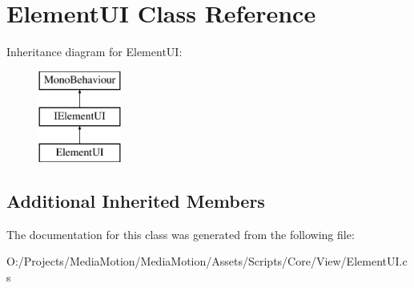 \hypertarget{class_element_u_i}{\section{Element\+U\+I Class Reference}
\label{class_element_u_i}
}
Inheritance diagram for Element\+U\+I\+:\begin{figure}[H]
\begin{center}
\leavevmode
\includegraphics[height=3.000000cm]{class_element_u_i}
\end{center}
\end{figure}
\subsection*{Additional Inherited Members}


The documentation for this class was generated from the following file\+:\begin{DoxyCompactItemize}
\item 
O\+:/\+Projects/\+Media\+Motion/\+Media\+Motion/\+Assets/\+Scripts/\+Core/\+View/Element\+U\+I.\+cs\end{DoxyCompactItemize}
